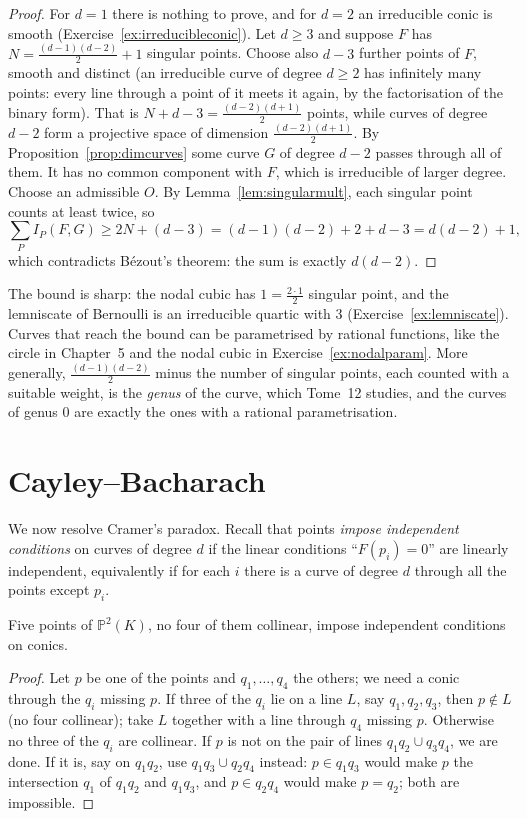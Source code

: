 \begin{proof}
For $d=1$ there is nothing to prove, and for $d=2$ an irreducible conic is smooth (Exercise~\ref{ex:irreducibleconic}). Let $d\ge3$ and suppose $F$ has
$N=\frac{(d-1)(d-2)}2+1$ singular points. Choose also $d-3$ further points of $F$, smooth and distinct (an irreducible curve of degree $d\ge2$ has
infinitely many points: every line through a point of it meets it again, by the factorisation of the binary form). That is
$N+d-3=\frac{(d-2)(d+1)}2$ points, while curves of degree $d-2$ form a projective space of dimension $\frac{(d-2)(d+1)}2$. By
Proposition~\ref{prop:dimcurves} some curve $G$ of degree $d-2$ passes through all of them. It has no common component with $F$, which is irreducible of
larger degree. Choose an admissible $O$. By Lemma~\ref{lem:singularmult}, each singular point counts at least twice, so
\[
\sum_PI_P(F,G)\ge2N+(d-3)=(d-1)(d-2)+2+d-3=d(d-2)+1,
\]
which contradicts B\'ezout's theorem: the sum is exactly $d(d-2)$.
\end{proof}

The bound is sharp: the nodal cubic has $1=\frac{2\cdot1}2$ singular point, and the lemniscate of Bernoulli is an irreducible quartic with $3$
(Exercise~\ref{ex:lemniscate}). Curves that reach the bound can be parametrised by rational functions, like the circle in
Chapter~5 and the nodal cubic in Exercise~\ref{ex:nodalparam}. More generally, $\frac{(d-1)(d-2)}2$ minus the number of singular points, each counted with a
suitable weight, is the \emph{genus} of the curve, which Tome~12 studies, and the curves of genus $0$ are exactly the ones with a rational parametrisation.

\section{Cayley--Bacharach}

We now resolve Cramer's paradox. Recall that points \emph{impose independent conditions} on curves of degree $d$ if the linear conditions ``$F(p_i)=0$''
are linearly independent, equivalently if for each $i$ there is a curve of degree $d$ through all the points except $p_i$.

\begin{lemma}\label{lem:fivepointsconics}
Five points of $\mathbb P^2(K)$, no four of them collinear, impose independent conditions on conics.
\end{lemma}

\begin{proof}
Let $p$ be one of the points and $q_1,\dots,q_4$ the others; we need a conic through the $q_i$ missing $p$. If three of the $q_i$ lie on a line $L$, say
$q_1,q_2,q_3$, then $p\notin L$ (no four collinear); take $L$ together with a line through $q_4$ missing $p$. Otherwise no three of the $q_i$ are collinear.
If $p$ is not on the pair of lines $q_1q_2\cup q_3q_4$, we are done. If it is, say on $q_1q_2$, use $q_1q_3\cup q_2q_4$ instead: $p\in q_1q_3$ would make $p$ the
intersection $q_1$ of $q_1q_2$ and $q_1q_3$, and $p\in q_2q_4$ would make $p=q_2$; both are impossible.
\end{proof}

